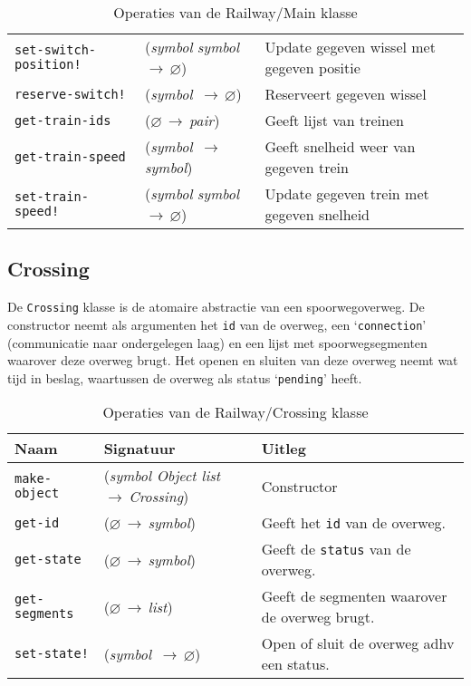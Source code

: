\documentclass[a4paper, 11pt]{article}
\newcommand{\naar}{\,$\rightarrow$\,}
\renewcommand{\empty}{$\varnothing$}
\newcommand{\<}{\scriptsize\textless\normalsize}
\renewcommand{\>}{\scriptsize\textgreater\normalsize}
\begin{document}
\begin{table}[H]
\begin{center}
{\begin{tabular}{|l l l|}
			\texttt{set-switch-position!} & (\textit{symbol} \textit{symbol} \naar \empty) & Update gegeven wissel met gegeven positie\\
			\texttt{reserve-switch!} & (\textit{symbol} \naar \empty) & Reserveert gegeven wissel\\
			\texttt{get-train-ids} & (\empty \naar \textit{pair}) & Geeft lijst van treinen\\
			\texttt{get-train-speed} & (\textit{symbol} \naar \textit{symbol}) & Geeft snelheid weer van gegeven trein\\
			\texttt{set-train-speed!} & (\textit{symbol} \textit{symbol} \naar \empty) & Update gegeven trein met gegeven snelheid\\
			\hline
		\end{tabular}}
		\caption{Operaties van de Railway/Main klasse}
	\end{center}
\end{table}

\subsection{Crossing} %
De \texttt{Crossing} klasse is de atomaire abstractie van een spoorwegoverweg. De constructor neemt als argumenten het \texttt{id} van de overweg, een \lq\texttt{connection}' (communicatie naar ondergelegen laag) en een lijst met spoorwegsegmenten waarover deze overweg brugt. Het openen en sluiten van deze overweg neemt wat tijd in beslag, waartussen de overweg als status \lq\texttt{pending}' heeft.
\begin{table}[H]
	\begin{center}
		{
		\begin{tabular}{|l l l|}
			\hline
			\textbf{Naam} & \textbf{Signatuur} & \textbf{Uitleg}\\
			\hline
			\texttt{make-object} & (\textit{symbol Object list} \naar \textit{Crossing}) & Constructor\\
			\hline
			\texttt{get-id} & (\empty \naar \textit{symbol}) & Geeft het \texttt{id} van de overweg.\\
			\texttt{get-state} & (\empty \naar \textit{symbol}) & Geeft de \texttt{status} van de overweg.\\
			\texttt{get-segments} & (\empty \naar \textit{list}) & Geeft de segmenten waarover de overweg brugt.\\
			\texttt{set-state!} & (\textit{symbol} \naar \empty) & Open of sluit de overweg adhv een status.\\
			\hline
		\end{tabular}}
		\caption{Operaties van de Railway/Crossing klasse}
	\end{center}
\end{table}
\end{document}
